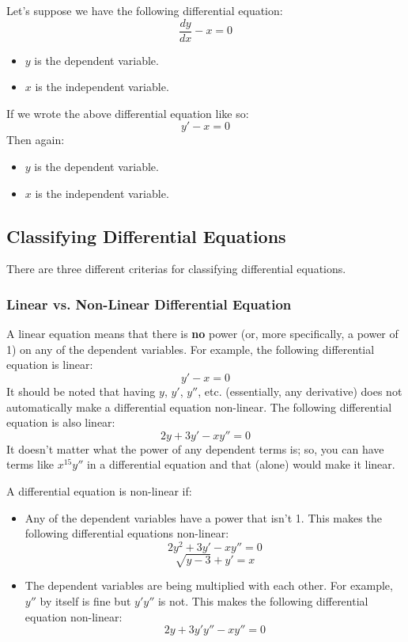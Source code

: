 \documentclass[letterpaper]{article}
\begin{document}
Let's suppose we have the following differential equation: 
\[\frac{dy}{dx} - x = 0\]
\begin{itemize}
    \item $y$ is the dependent variable. 
    \item $x$ is the independent variable.
\end{itemize}
If we wrote the above differential equation like so: 
\[y' - x = 0\]
Then again: 
\begin{itemize} 
    \item $y$ is the dependent variable.
    \item $x$ is the independent variable. 
\end{itemize}

\subsection{Classifying Differential Equations}
There are three different criterias for classifying differential equations.

\subsubsection{Linear vs. Non-Linear Differential Equation}
A linear equation means that there is \textbf{no} power (or, more specifically, a power of 1) on any of the dependent variables. For example, the following differential equation is linear: 
\[y' - x = 0\]
It should be noted that having $y$, $y'$, $y''$, etc. (essentially, any derivative) does not automatically make a differential equation non-linear. The following differential equation is also linear: 
\[2y + 3y' - xy'' = 0\]
It doesn't matter what the power of any dependent terms is; so, you can have terms like $x^{15}y''$ in a differential equation and that (alone) would make it linear.

\bigskip 

A differential equation is non-linear if:
\begin{itemize}
    \item Any of the dependent variables have a power that isn't 1. This makes the following differential equations non-linear: 
    \[2\boxed{y^2} + 3y' - xy'' = 0\]
    \[\boxed{\sqrt{y - 3}} + y' = x\]

    \item The dependent variables are being multiplied with each other. For example, $y''$ by itself is fine but $y'y''$ is not. This makes the following differential equation non-linear: 
    \[2y + 3\boxed{y'y''} - xy'' = 0\]
\end{itemize}
\end{document}
